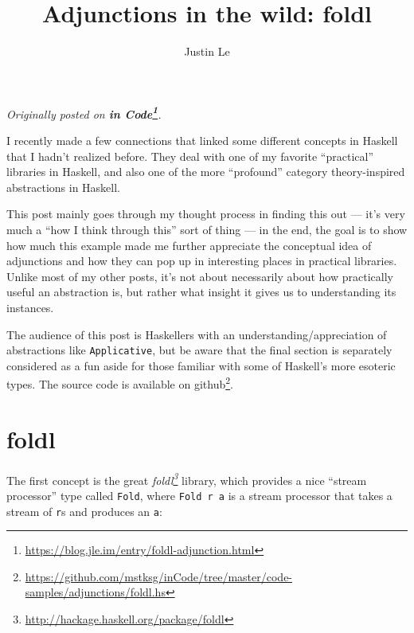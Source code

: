 \documentclass[]{article}
\title{Adjunctions in the wild: foldl}
\author{Justin Le}
\renewcommand{\href}[2]{#2\footnote{\url{#1}}}
\begin{document}
\maketitle

\emph{Originally posted on
\textbf{\href{https://blog.jle.im/entry/foldl-adjunction.html}{in Code}}.}

I recently made a few connections that linked some different concepts in Haskell
that I hadn't realized before. They deal with one of my favorite ``practical''
libraries in Haskell, and also one of the more ``profound'' category
theory-inspired abstractions in Haskell.

This post mainly goes through my thought process in finding this out --- it's
very much a ``how I think through this'' sort of thing --- in the end, the goal
is to show how much this example made me further appreciate the conceptual idea
of adjunctions and how they can pop up in interesting places in practical
libraries. Unlike most of my other posts, it's not about necessarily about how
practically useful an abstraction is, but rather what insight it gives us to
understanding its instances.

The audience of this post is Haskellers with an understanding/appreciation of
abstractions like \texttt{Applicative}, but be aware that the final section is
separately considered as a fun aside for those familiar with some of Haskell's
more esoteric types. The source code is
\href{https://github.com/mstksg/inCode/tree/master/code-samples/adjunctions/foldl.hs}{available
on github}.

\hypertarget{foldl}{%
\section{foldl}\label{foldl}}

The first concept is the great
\emph{\href{http://hackage.haskell.org/package/foldl}{foldl}} library, which
provides a nice ``stream processor'' type called \texttt{Fold}, where
\texttt{Fold\ r\ a} is a stream processor that takes a stream of \texttt{r}s and
produces an \texttt{a}:
\end{document}
